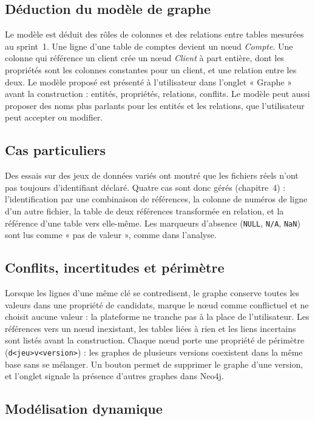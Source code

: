 \subsection{Déduction du modèle de graphe}

Le modèle est déduit des rôles de colonnes et des relations entre tables mesurées au sprint~1. Une ligne d'une table de comptes devient un nœud \textit{Compte}. Une colonne qui référence un client crée un nœud \textit{Client} à part entière, dont les propriétés sont les colonnes constantes pour un client, et une relation entre les deux. Le modèle proposé est présenté à l'utilisateur dans l'onglet « Graphe » avant la construction : entités, propriétés, relations, conflits. Le modèle peut aussi proposer des noms plus parlants pour les entités et les relations, que l'utilisateur peut accepter ou modifier.

\subsection{Cas particuliers}

Des essais sur des jeux de données variés ont montré que les fichiers réels n'ont pas toujours d'identifiant déclaré. Quatre cas sont donc gérés (chapitre~4) : l'identification par une combinaison de références, la colonne de numéros de ligne d'un autre fichier, la table de deux références transformée en relation, et la référence d'une table vers elle-même. Les marqueurs d'absence (\texttt{NULL}, \texttt{N/A}, \texttt{NaN}) sont lus comme « pas de valeur », comme dans l'analyse.

\subsection{Conflits, incertitudes et périmètre}

Lorsque les lignes d'une même clé se contredisent, le graphe conserve toutes les valeurs dans une propriété de candidats, marque le nœud comme conflictuel et ne choisit aucune valeur : la plateforme ne tranche pas à la place de l'utilisateur. Les références vers un nœud inexistant, les tables liées à rien et les liens incertains sont listés avant la construction. Chaque nœud porte une propriété de périmètre (\texttt{d<jeu>v<version>}) : les graphes de plusieurs versions coexistent dans la même base sans se mélanger. Un bouton permet de supprimer le graphe d'une version, et l'onglet signale la présence d'autres graphes dans Neo4j.

\subsection{Modélisation dynamique}

